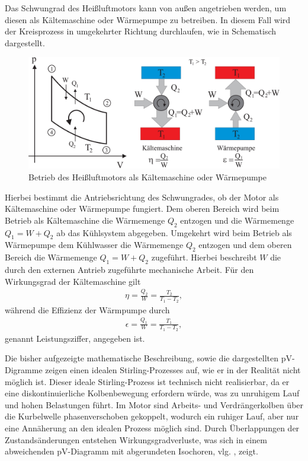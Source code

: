 Das Schwungrad des Heißluftmotors kann von außen angetrieben werden, um diesen als Kältemaschine oder Wärmepumpe zu betreiben. In diesem Fall wird der Kreisprozess in umgekehrter Richtung durchlaufen, wie in  Schematisch dargestellt.

\begin{figure}[H]
  \centering
  \includegraphics[width=.65\textwidth]{files/reverse_process_pv.png}
  \caption{Betrieb des Heißluftmotors als Kältemaschine oder Wärmepumpe}
  \label{fig:reverse_process_pv}
\end{figure}

Hierbei bestimmt die Antriebsrichtung des Schwungrades, ob der Motor als Kältemaschine oder Wärmepumpe fungiert. Dem oberen Bereich wird beim Betrieb als Kältemaschine die Wärmemenge $Q_2$ entzogen und die Wärmemenge $Q_1 = W + Q_2$ ab das Kühlsystem abgegeben. Umgekehrt wird beim Betrieb als Wärmepumpe dem Kühlwasser die Wärmemenge $Q_2$ entzogen und dem oberen Bereich die Wärmemenge $Q_1 = W + Q_2$ zugeführt. Hierbei beschreibt $W$ die durch den externen Antrieb zugeführte mechanische Arbeit. Für den Wirkungsgrad der Kältemaschine gilt
\begin{align}
  \eta = \frac{Q_2}{W} = \frac{T_2}{T_1 - T_2},
\end{align}
während die Effizienz der Wärmpumpe durch
\begin{align}
  \epsilon = \frac{Q_1}{W} = \frac{T_1}{T_1 - T_2},
\end{align}
genannt Leistungsziffer, angegeben ist.

Die bisher aufgezeigte mathematische Beschreibung, sowie die dargestellten pV-Digramme zeigen einen idealen Stirling-Prozesses auf, wie er in der Realität nicht möglich ist. Dieser ideale Stirling-Prozess ist technisch nicht realisierbar, da er eine diskontinuierliche Kolbenbewegung erfordern würde, was zu unruhigem Lauf und hohen Belastungen führt. Im Motor sind Arbeits- und Verdrängerkolben über die Kurbelwelle phasenverschoben gekoppelt, wodurch ein ruhiger Lauf, aber nur eine Annäherung an den idealen Prozess möglich sind. Durch Überlappungen der Zustandsänderungen entstehen Wirkungsgradverluste, was sich in einem abweichenden pV-Diagramm mit abgerundeten Isochoren, vlg. , zeigt.


